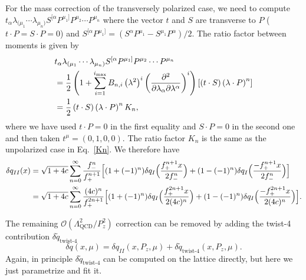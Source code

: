 For the mass correction of the transversely polarized case, we need to
compute
$t_\alpha \lambda_{(\mu_1}\cdots \lambda_{\mu_n)}S^{[\alpha}P^{\mu_1]}P^{\mu_2}\cdots P^{\mu_n}$ where the vector $t$
 and $S$ are transverse to $P$ ($t\cdot P=S\cdot P=0$) 
and $S^{[\alpha}P^{\mu_1]}=\left(S^\alpha P^{\mu_1}-S^{\mu_1}P^\alpha \right)/2$. The ratio factor between moments is given by
\begin{align}
& t_\alpha \lambda_{(\mu_1}\cdots \lambda_{\mu_n)}
  S^{[\alpha}P^{\mu_1]}P^{\mu_2}\cdots P^{\mu_n}  \notag \\
&= \frac{1}{2} \left(1+\sum_{i=1}^{i_\text{max}}
  B_{n,i} \left(\lambda^2\right)^i
    \left(\frac{\partial^2}{\partial \lambda_\alpha \partial \lambda^\alpha}\right)^i\right)
  \left[ \left(t\cdot S\right) \left(\lambda \cdot P\right)^n\right]  \notag \\
&= \frac{1}{2}\left(t\cdot S\right) \left(\lambda \cdot P\right)^n K_n,
\end{align}
%
where we have used $t\cdot P=0$ in the first equality and $S\cdot P=0$ in
the second one and then taken $t^\mu =(0,1,0,0)$. The ratio factor $K_n$ is the same as the unpolarized case in Eq.~\ref{Kn}. We therefore have
%
\begin{align}
\delta q_{II}(x)&=\sqrt{1+4c}\sum_{n=0}^\infty \frac{f_-^n}{f_+^{n+1}}\Big[(1+(-1)^n)\delta q_I\Big(\frac{f_+^{n+1}x}{2f_-^n}\Big)+(1-(-1)^n)\delta q_I\Big(\frac{-f_+^{n+1}x}{2f_-^n}\Big)\Big]\nonumber\\
&=\sqrt{1+4c}\sum_{n=0}^\infty \frac{(4c)^n}{f_+^{2n+1}}\Big[(1+(-1)^n)\delta q_I\Big(\frac{f_+^{2n+1}x}{2(4c)^n}\Big)+(1-(-1)^n)\delta q_I\Big(\frac{-f_+^{2n+1}x}{2(4c)^n}\Big)\Big].
\end{align}

The remaining $\mathcal{O}\left(\Lambda_\text{QCD}^2/P_z^2\right)$ correction
can be removed by adding the twist-4 contribution
$\delta \tilde{q}_\text{twist-4}$
%
\begin{equation}
\delta q(x,\mu) = \delta q_{II}(x,P_z,\mu)
  + \delta \tilde{q}_\text{twist-4}(x,P_z,\mu).
\end{equation}
%
Again, in principle $\delta \tilde{q}_\text{twist-4}$ can be computed on the lattice
directly, but here we just parametrize and fit it.
